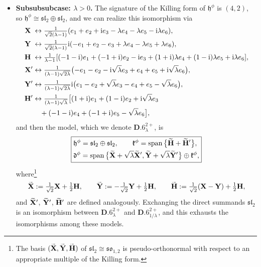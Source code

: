 \documentclass[pdftex]{sigma}
\newlength{\caseIndent}
\newcommand{\wt} [1]{\smash{\widetilde{#1}}}
\newcommand{\mbH}{\mathbf{H}}
\newcommand{\mbX}{\mathbf{X}}
\newcommand{\mbY}{\mathbf{Y}}
\newcommand{\mfd} {\mathfrak{d}}
\newcommand{\mfh} {\mathfrak{h}}
\newcommand{\mfk} {\mathfrak{k}}
\newcommand{\mfsl} {\mathfrak{sl}}
\newcommand{\mfso} {\mathfrak{so}}
\numberwithin{equation}{section}
\begin{document}
\begin{itemize}[leftmargin=\caseIndent]
\begin{itemize}[leftmargin=\caseIndent]
\begin{itemize}[leftmargin=\caseIndent]
		\item[] \textbf{Subsubsubcase: $\lambda > 0$.} The signature of the Killing form of $\mfh^{\phi}$ is $(4, 2)$, so $\mfh^{\phi} \cong \mfsl_2 \oplus \mfsl_2$, and we can realize this isomorphism via
			\begin{align*}
				\mbX\phantom{'}
					&\leftrightarrow \tfrac{1}{\sqrt{2} (\lambda - 1)} (e_1 + e_2 + {\rm i} e_3 - \lambda e_4 - \lambda e_5 - {\rm i} \lambda e_6) , \\
				\mbY\phantom{'}
					&\leftrightarrow \tfrac{1}{\sqrt{2} (\lambda - 1)} {\rm i} (-e_1 + e_2 - e_3 + \lambda e_4 - \lambda e_5 + \lambda e_6), \\
				\mbH\phantom{'}
					&\leftrightarrow \tfrac{1}{\lambda - 1} [(-1 - {\rm i}) e_ 1 + (-1 + {\rm i}) e_2 - {\rm i} e_3 + (1 + {\rm i}) \lambda e_4 + (1 - {\rm i}) \lambda e_5 + {\rm i} \lambda e_6], \\
 \mbX'
					&\leftrightarrow \tfrac{1}{(\lambda - 1) \sqrt{2 \lambda}} \big({-}e_1 - e_2 - {\rm i} \sqrt{\lambda} e_3 + e_4 + e_5 + {\rm i} \sqrt{\lambda} e_6\big), \\
				\mbY'
					&\leftrightarrow \tfrac{1}{(\lambda - 1) \sqrt{2 \lambda}} {\rm i} \big(e_1 - e_2 + \sqrt{\lambda} e_3 - e_4 + e_5 - \sqrt{\lambda} e_6\big), \\
				\mbH'
					&\leftrightarrow \tfrac{1}{(\lambda - 1) \sqrt{\lambda}} \big[(1 + {\rm i}) e_1 + (1 - {\rm i}) e_2 + {\rm i} \sqrt{\lambda} e_3 \\
 &\quad{} + (-1 - {\rm i}) e_4 + (-1 + {\rm i}) e_5 - \sqrt{\lambda} e_6\big] ,
			\end{align*}
		and then the model, which we denote $\mathbf{D.6}_{\lambda}^{2+}$, is
			\begin{equation*}
				\boxed{
 \begin{split}
& \mfh^{\phi} = \mfsl_2 \oplus \mfsl_2 , \qquad
	 	 \mfk^{\phi} = \operatorname{span}\big\{\wt\mbH + \wt\mbH'\big\} , \\
& \mfd^{\phi} = \operatorname{span}\big\{\wt\mbX + \sqrt{\lambda} \wt\mbX', \wt\mbY + \sqrt{\lambda} \wt\mbY'\big\} \oplus \mfk^{\phi} ,
 \end{split}
				}
			\end{equation*}
		where\footnote{The basis $(\wt\mbX, \wt\mbY, \wt\mbH)$ of $\mfsl_2 \cong \mfso_{1, 2}$ is pseudo-orthonormal with respect to an appropriate multiple of the Killing form.}
		\begin{gather*}
			\wt\mbX := \tfrac{1}{\sqrt{2}} \mbX + \tfrac{1}{2} \mbH , \qquad
			\wt\mbY := -\tfrac{1}{\sqrt{2}} \mbY + \tfrac{1}{2} \mbH , \qquad
			\wt\mbH := \tfrac{1}{\sqrt{2}} (\mbX - \mbY) + \tfrac{1}{2} \mbH ,
		\end{gather*}
		and $\wt\mbX'$, $\wt\mbY'$, $\wt\mbH'$ are defined analogously. Exchanging the direct summands $\mfsl_2$ is an isomorphism between $\mathbf{D.6}_{\lambda}^{2+}$ and $\mathbf{D.6}_{1 / \lambda}^{2+}$, and this exhausts the isomorphisms among these models.


\end{itemize}
\end{itemize}
\end{itemize}
\end{document}
